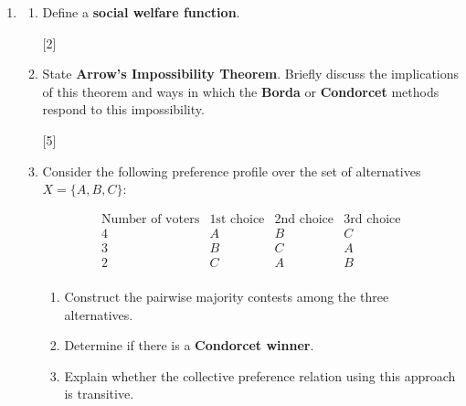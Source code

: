 \documentclass[12pt,a4paper]{article}
\begin{document}
\begin{enumerate}
\begin{enumerate}
        \[
        v^+(C) = v_1(C) + v_2(C) \quad \text{for all } C \subseteq \Omega
        \]

        A payoff vector \(\lambda\) satisfies the additivity property if:

        \[
        \lambda_i^{(G^+)} = \lambda_i^{(G_1)} + \lambda_i^{(G_2)}
        \]

        Using the two games from part (c), demonstrate that the Shapley value has
        the additivity property.

        \hfill{[7]}
     
    \end{enumerate}

\newpage
\item

    \begin{enumerate}
        \item Define a \textbf{social welfare function}.

        \hfill{[2]}

        \item State \textbf{Arrow’s Impossibility Theorem}.
        Briefly discuss the implications of this theorem and ways in which the \textbf{Borda} or
        \textbf{Condorcet} methods respond to this impossibility.

        \hfill{[5]}

        \item Consider the following preference profile over the set of
        alternatives $X = \{A, B, C\}$:

        \[
        \begin{array}{c|ccc}
        \text{Number of voters} & \text{1st choice} & \text{2nd choice} & \text{3rd choice} \\
        \hline
        4 & A & B & C \\
        3 & B & C & A \\
        2 & C & A & B \\
        \end{array}
        \]

        \begin{enumerate}
            \item Construct the pairwise majority contests among the three
            alternatives.
            \item Determine if there is a \textbf{Condorcet winner}.
            \item Explain whether the collective preference relation using this
                approach is transitive.
        \end{enumerate}


\end{enumerate}
\end{enumerate}
\end{document}
